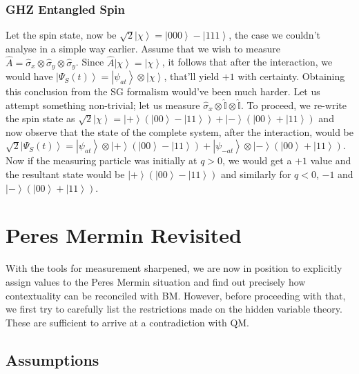 \subsubsection{GHZ Entangled Spin}

Let the spin state, now be $\sqrt{2}\left|\chi\right\rangle =\left|000\right\rangle -\left|111\right\rangle $,
the case we couldn't analyse in a simple way earlier. Assume that
we wish to measure $\hat{A}=\hat{\sigma}_{x}\otimes\hat{\sigma}_{y}\otimes\hat{\sigma}_{y}$.
Since $\hat{A}\left|\chi\right\rangle =\left|\chi\right\rangle $,
it follows that after the interaction, we would have $\left|\Psi_{S}(t)\right\rangle =\left|\psi_{at}\right\rangle \otimes\left|\chi\right\rangle $,
that'll yield $+1$ with certainty. Obtaining this conclusion from
the SG formalism would've been much harder. Let us attempt something
non-trivial; let us measure $\hat{\sigma}_{x}\otimes\hat{\mathbb{I}}\otimes\hat{\mathbb{I}}$.
To proceed, we re-write the spin state as $\sqrt{2}\left|\chi\right\rangle =\left|+\right\rangle (\left|00\right\rangle -\left|11\right\rangle )+\left|-\right\rangle (\left|00\right\rangle +\left|11\right\rangle )$
and now observe that the state of the complete system, after the interaction,
would be $\sqrt{2}\left|\Psi_{S}(t)\right\rangle =\left|\psi_{at}\right\rangle \otimes\left|+\right\rangle \left(\left|00\right\rangle -\left|11\right\rangle \right)+\left|\psi_{-at}\right\rangle \otimes\left|-\right\rangle (\left|00\right\rangle +\left|11\right\rangle )$.
Now if the measuring particle was initially at $q>0$, we would get
a $+1$ value and the resultant state would be $\left|+\right\rangle \left(\left|00\right\rangle -\left|11\right\rangle \right)$
and similarly for $q<0$, $-1$ and $\left|-\right\rangle \left(\left|00\right\rangle +\left|11\right\rangle \right)$. 


\section{Peres Mermin Revisited\label{sec:Peres-Mermin-Revisited}}

With the tools for measurement sharpened, we are now in position to
explicitly assign values to the Peres Mermin situation and find out
precisely how contextuality can be reconciled with BM. However, before
proceeding with that, we first try to carefully list the restrictions
made on the hidden variable theory. These are sufficient to arrive
at a contradiction with QM.


\subsection{Assumptions}

